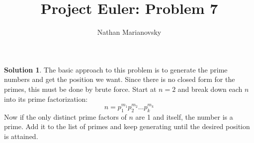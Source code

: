 \documentclass[12pt, letterpaper, onecolumn, conference, final]{IEEEtran}
\title{Project Euler: Problem 7}
\author{Nathan Marianovsky}
\theoremstyle{definition}
\newtheorem*{problem*}{Problem}
\newtheorem*{solution*}{Solution}
\theoremstyle{plain}
\begin{document}
\maketitle

\begin{center}
\end{center}

\vspace{.3cm}
\begin{solution*}
The basic approach to this problem is to generate the prime numbers and get the position we want. Since there is no closed form for the primes, this must be done by brute force. Start at $n=2$ and break down each $n$ into its prime factorization:
\begin{equation*}
n = p_1^{m_1} p_2^{m_2} \dots p_k^{m_k}
\end{equation*}
Now if the only distinct prime factors of $n$ are 1 and itself, the number is a prime. Add it to the list of primes and keep generating until the desired position is attained.
\end{solution*}
\end{document}
